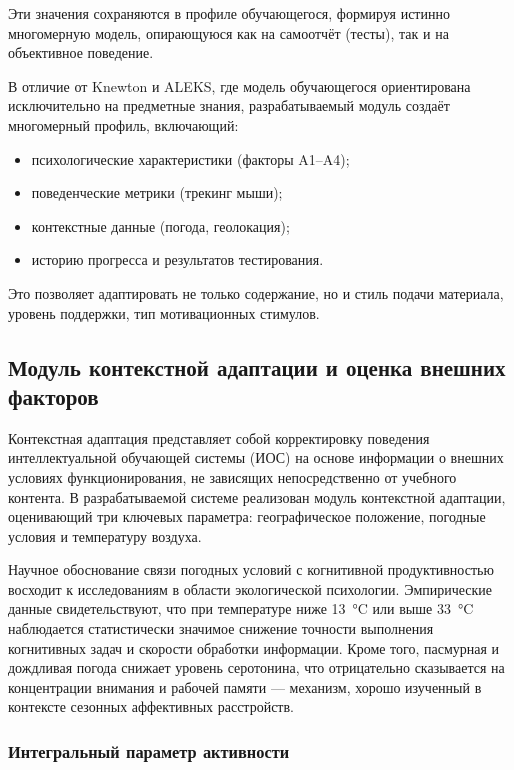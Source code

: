 Эти значения сохраняются в профиле обучающегося, формируя истинно многомерную модель, опирающуюся как на самоотчёт (тесты), так и на объективное поведение.

В отличие от Knewton и ALEKS, где модель обучающегося ориентирована исключительно на предметные знания, разрабатываемый модуль создаёт многомерный профиль, включающий:
\begin{itemize}
    \item психологические характеристики (факторы A1--A4);
    \item поведенческие метрики (трекинг мыши);
    \item контекстные данные (погода, геолокация);
    \item историю прогресса и результатов тестирования.
\end{itemize}

Это позволяет адаптировать не только содержание, но и стиль подачи материала, уровень поддержки, тип мотивационных стимулов.

\subsection{Модуль контекстной адаптации и оценка внешних факторов}
\label{sec:contextual_adaptation}

Контекстная адаптация представляет собой корректировку поведения интеллектуальной обучающей системы (ИОС) на основе информации о внешних условиях функционирования, не зависящих непосредственно от учебного контента. В разрабатываемой системе реализован модуль контекстной адаптации, оценивающий три ключевых параметра: географическое положение, погодные условия и температуру воздуха.

Научное обоснование связи погодных условий с когнитивной продуктивностью восходит к исследованиям в области экологической психологии. Эмпирические данные свидетельствуют, что при температуре ниже 13~°C или выше 33~°C наблюдается статистически значимое снижение точности выполнения когнитивных задач и скорости обработки информации. Кроме того, пасмурная и дождливая погода снижает уровень серотонина, что отрицательно сказывается на концентрации внимания и рабочей памяти --- механизм, хорошо изученный в контексте сезонных аффективных расстройств.

\subsubsection*{Интегральный параметр активности}

